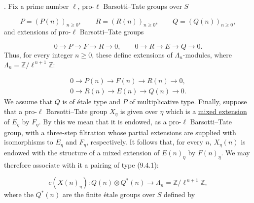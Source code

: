 
\medskip
{}. Fix a prime number $\ell$, pro-$\ell$ Barsotti--Tate groups over $S$

\begin{equation}\tag{9.5.1}
P=(P(n))_{n\geq0},
\qquad R=(R(n))_{n\geq0},
\qquad Q=(Q(n))_{n\geq0},
\end{equation}
and extensions of pro-$\ell$ Barsotti--Tate groups

\begin{equation}\tag{9.5.2}
0\longrightarrow P\longrightarrow F\longrightarrow R\longrightarrow0,
\qquad
0\longrightarrow R\longrightarrow E\longrightarrow Q\longrightarrow0.
\end{equation}
Thus, for every integer $n\geq0$, these define extensions of
$\Lambda_n$-modules, where
$\Lambda_n=\mathbb Z/\ell^{\,n+1}\mathbb Z$:

\begin{equation}\tag{9.5.3}
\begin{gathered}
0\longrightarrow P(n)\longrightarrow F(n)\longrightarrow R(n)
 \longrightarrow0,\\
0\longrightarrow R(n)\longrightarrow E(n)\longrightarrow Q(n)
 \longrightarrow0.
\end{gathered}
\end{equation}
We assume that $Q$ is of étale type and $P$ of multiplicative type.
Finally, suppose that a pro-$\ell$ Barsotti--Tate group $X_\eta$ is given
over $\eta$ which is a \underline{mixed extension} of $E_\eta$ by $F_\eta$. By this
we mean that it is endowed, as a pro-$\ell$ Barsotti--Tate group, with a
three-step filtration whose partial extensions are supplied with
isomorphisms to $E_\eta$ and $F_\eta$, respectively. It follows that, for
every $n$, $X_\eta(n)$ is endowed with the structure of a mixed extension
of $E(n)_\eta$ by $F(n)_\eta$. We may therefore associate with it a pairing
of type (9.4.1):

\begin{equation}\tag{9.5.4}
c(X(n)_\eta):Q(n)\otimes Q^*(n)
\longrightarrow\Lambda_n=\mathbb Z/\ell^{\,n+1}\mathbb Z,
\end{equation}
where the $Q^*(n)$ are the finite étale groups over $S$ defined by

